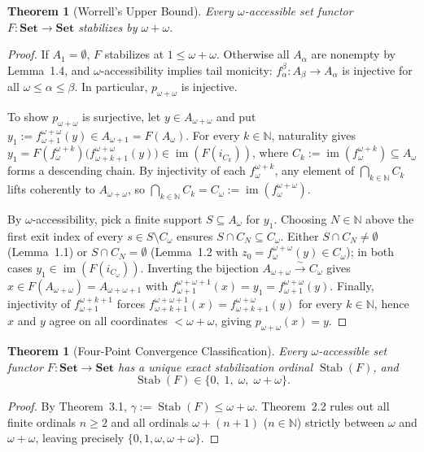 \documentclass[11pt,a4paper]{article}
\theoremstyle{plain}
\newtheorem{theorem}[lemma]{Theorem}
\newcommand{\Stab}{\operatorname{Stab}}
\newcommand{\im}{\operatorname{im}}
\newcommand{\Set}{\mathbf{Set}}
\begin{document}
\begin{theorem}[Worrell's Upper Bound]
Every $\omega$-accessible set functor $F : \Set \to \Set$ stabilizes by $\omega + \omega$.
\end{theorem}

\begin{proof}
If $A_1 = \emptyset$, $F$ stabilizes at $1 \le \omega + \omega$. Otherwise all $A_\alpha$ are nonempty by Lemma~1.4, and $\omega$-accessibility implies tail monicity: $f_\alpha^\beta : A_\beta \to A_\alpha$ is injective for all $\omega \le \alpha \le \beta$. In particular, $p_{\omega+\omega}$ is injective.

To show $p_{\omega+\omega}$ is surjective, let $y \in A_{\omega+\omega}$ and put $y_1 := f_{\omega+1}^{\omega+\omega}(y) \in A_{\omega+1} = F(A_\omega)$. For every $k \in \mathbb{N}$, naturality gives $y_1 = F(f_\omega^{\omega+k})\bigl(f_{\omega+k+1}^{\omega+\omega}(y)\bigr) \in \im(F(i_{C_k}))$, where $C_k := \im(f_\omega^{\omega+k}) \subseteq A_\omega$ forms a descending chain. By injectivity of each $f_\omega^{\omega+k}$, any element of $\bigcap_{k \in \mathbb{N}} C_k$ lifts coherently to $A_{\omega+\omega}$, so $\bigcap_{k \in \mathbb{N}} C_k = C_\omega := \im(f_\omega^{\omega+\omega})$.

By $\omega$-accessibility, pick a finite support $S \subseteq A_\omega$ for $y_1$. Choosing $N \in \mathbb{N}$ above the first exit index of every $s \in S \setminus C_\omega$ ensures $S \cap C_N \subseteq C_\omega$. Either $S \cap C_N \neq \emptyset$ (Lemma~1.1) or $S \cap C_N = \emptyset$ (Lemma~1.2 with $z_0 = f_\omega^{\omega+\omega}(y) \in C_\omega$); in both cases $y_1 \in \im(F(i_{C_\omega}))$. Inverting the bijection $A_{\omega+\omega} \xrightarrow{\sim} C_\omega$ gives $x \in F(A_{\omega+\omega}) = A_{\omega+\omega+1}$ with $f_{\omega+1}^{\omega+\omega+1}(x) = y_1 = f_{\omega+1}^{\omega+\omega}(y)$. Finally, injectivity of $f_{\omega+1}^{\omega+k+1}$ forces $f_{\omega+k+1}^{\omega+\omega+1}(x) = f_{\omega+k+1}^{\omega+\omega}(y)$ for every $k \in \mathbb{N}$, hence $x$ and $y$ agree on all coordinates $< \omega + \omega$, giving $p_{\omega+\omega}(x) = y$.
\end{proof}

\begin{theorem}[Four-Point Convergence Classification]
Every $\omega$-accessible set functor $F : \Set \to \Set$ has a unique exact stabilization ordinal $\Stab(F)$, and
\[
  \Stab(F) \in \{0,\; 1,\; \omega,\; \omega + \omega\}.
\]
\end{theorem}

\begin{proof}
By Theorem~3.1, $\gamma := \Stab(F) \le \omega + \omega$. Theorem~2.2 rules out all finite ordinals $n \ge 2$ and all ordinals $\omega + (n + 1)$ ($n \in \mathbb{N}$) strictly between $\omega$ and $\omega + \omega$, leaving precisely $\{0, 1, \omega, \omega + \omega\}$.
\end{proof}
\end{document}
